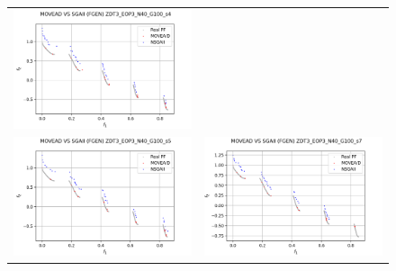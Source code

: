 \begin{figure}[H]
\begin{tabular}{c c}
    \includegraphics[scale=0.5]{figures/ZDT3_EOP3_N40_G100_T6/s4_comp.png}\\
    \includegraphics[scale=0.5]{figures/ZDT3_EOP3_N40_G100_T6/s5_comp.png} &
    \includegraphics[scale=0.5]{figures/ZDT3_EOP3_N40_G100_T6/s7_comp.png}\\

\end{tabular}
\end{figure}
